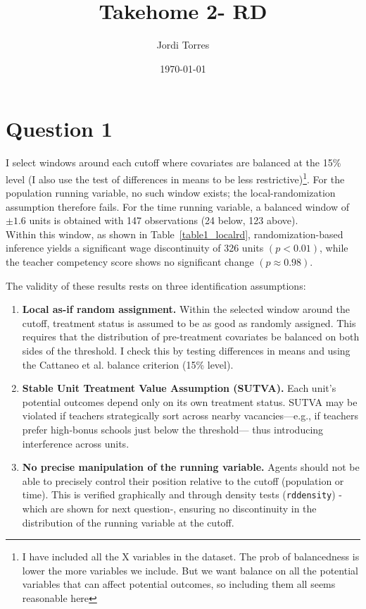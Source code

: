 \documentclass{article}
\begin{document}
\title{Takehome 2- RD}
\author{Jordi Torres}
\date{\today}


\maketitle



\section*{Question 1}

I select windows around each cutoff where covariates are balanced at the 15\% level (I also use the test of differences in means to be less restrictive)\footnote{I have included all the X variables in the dataset. The prob of balancedness is lower the more variables we include. But we want balance on all the potential variables that can affect potential outcomes, so including them all seems reasonable here}. For the population running variable, no such window exists; the local-randomization assumption therefore fails. For the time running variable, a balanced window of $\pm 1.6$ units is obtained with 147 observations (24 below, 123 above).\\

Within this window, as shown in Table~\ref{table1_localrd}, randomization-based inference yields a significant wage discontinuity of 326 units $(p < 0.01)$, while the teacher competency score shows no significant change $(p \approx 0.98)$.

\vspace{0.5em}
\noindent
The validity of these results rests on three identification assumptions:

\begin{enumerate}
    \item \textbf{Local as-if random assignment.} Within the selected window around the cutoff, treatment status is assumed to be as good as randomly assigned. This requires that the distribution of pre-treatment covariates be balanced on both sides of the threshold. I check this by testing differences in means and using the Cattaneo et al. balance criterion (15\% level).

    \item \textbf{Stable Unit Treatment Value Assumption (SUTVA).} Each unit’s potential outcomes depend only on its own treatment status. SUTVA may be violated if teachers strategically sort across nearby vacancies—e.g., if teachers prefer high-bonus schools just below the threshold— thus introducing interference across units.

    \item \textbf{No precise manipulation of the running variable.} Agents should not be able to precisely control their position relative to the cutoff (population or time). This is verified graphically and through density tests (\texttt{rddensity}) -which are shown for next question-, ensuring no discontinuity in the distribution of the running variable at the cutoff.
\end{enumerate}
\end{document}
